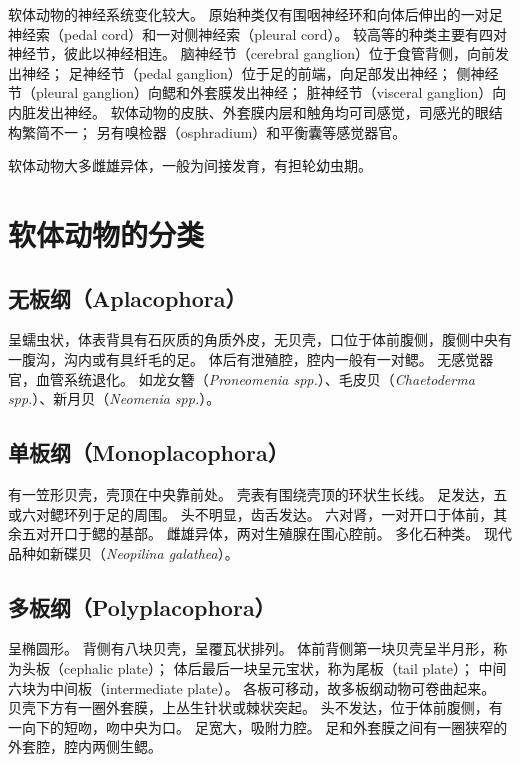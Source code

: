 \documentclass[11pt]{article}
\begin{document}
\newline

软体动物的神经系统变化较大。
原始种类仅有围咽神经环和向体后伸出的一对足神经索（pedal cord）和一对侧神经索（pleural cord）。
较高等的种类主要有四对神经节，彼此以神经相连。
脑神经节（cerebral ganglion）位于食管背侧，向前发出神经；
足神经节（pedal ganglion）位于足的前端，向足部发出神经；
侧神经节（pleural ganglion）向鳃和外套膜发出神经；
脏神经节（visceral ganglion）向内脏发出神经。
软体动物的皮肤、外套膜内层和触角均可司感觉，司感光的眼结构繁简不一；
另有嗅检器（osphradium）和平衡囊等感觉器官。

\newline

软体动物大多雌雄异体，一般为间接发育，有担轮幼虫期。
  
\section{软体动物的分类}
\subsection{无板纲（Aplacophora）}
呈蠕虫状，体表背具有石灰质的角质外皮，无贝壳，口位于体前腹侧，腹侧中央有一腹沟，沟内或有具纤毛的足。
体后有泄殖腔，腔内一般有一对鳃。
无感觉器官，血管系统退化。
如龙女簪（\textit{Proneomenia spp.}）、毛皮贝（\textit{Chaetoderma spp.}）、新月贝（\textit{Neomenia spp.}）。

\subsection{单板纲（Monoplacophora）}
有一笠形贝壳，壳顶在中央靠前处。
壳表有围绕壳顶的环状生长线。
足发达，五或六对鳃环列于足的周围。
头不明显，齿舌发达。
六对肾，一对开口于体前，其余五对开口于鳃的基部。
雌雄异体，两对生殖腺在围心腔前。
多化石种类。
现代品种如新碟贝（\textit{Neopilina galathea}）。

\subsection{多板纲（Polyplacophora）}
呈椭圆形。
背侧有八块贝壳，呈覆瓦状排列。
体前背侧第一块贝壳呈半月形，称为头板（cephalic plate）；
体后最后一块呈元宝状，称为尾板（tail plate）；
中间六块为中间板（intermediate plate）。
各板可移动，故多板纲动物可卷曲起来。
贝壳下方有一圈外套膜，上丛生针状或棘状突起。
头不发达，位于体前腹侧，有一向下的短吻，吻中央为口。
足宽大，吸附力腔。
足和外套膜之间有一圈狭窄的外套腔，腔内两侧生鳃。
\end{document}

